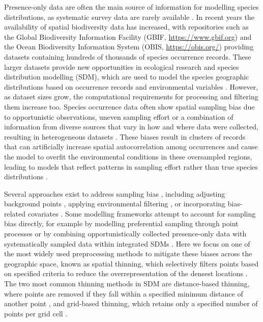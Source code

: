 Presence-only data are often the main source of information for modelling species distributions, as systematic survey data are rarely available \citep{pearce2006modelling}. In recent years the availability of spatial biodiversity data has increased, with repositories such as the Global Biodiversity Information Facility (GBIF, \url{https://www.gbif.org}) and the Ocean Biodiversity Information System (OBIS, \url{https://obis.org/}) providing datasets containing hundreds of thousands of species occurrence records. These larger datasets provide new opportunities in ecological research and species distribution modelling (SDM), which are used to model the species geographic distributions based on occurrence records and environmental variables \citep{pulliam2000relationship, elith2009species, miller2010species, guisan2013predicting}. However, as dataset sizes grow, the computational requirements for processing and filtering them increase too. Species occurrence data often show spatial sampling bias due to opportunistic observations, uneven sampling effort or a combination of information from diverse sources that vary in how and where data were collected, resulting in heterogeneous datasets \citep{boakes2010distorted, lobo2011exploring, beck2014spatial, meyer2016range, hughes2021sampling}. These biases result in clusters of records that can artificially increase spatial autocorrelation among occurrences and cause the model to overfit the environmental conditions in these oversampled regions, leading to models that reflect patterns in sampling effort rather than true species distributions \citep{wisz2008effects, phillips2009sample, higa2015mapping, cosentino2021geographic, steen2021spatial}.

Several approaches exist to address sampling bias \citep{inman2021comparing, baker2024effective, moudry2024optimising}, including adjusting background points \citep{barber2022target, vollering2019bunching}, applying environmental filtering \citep{castellanos2019environmental}, or incorporating bias-related covariates \citep{varela2014environmental, chauvier2021novel}. Some modelling frameworks attempt to account for sampling bias directly, for example by modelling preferential sampling through point processes \citep{diggle2010geostatistical, pennino2019accounting, amaral2024model} or by combining opportunistically collected presence-only data with systematically sampled data within integrated SDMs \citep{koshkina2017integrated, simmonds2020more, makinen2024integrated}. Here we focus on one of the most widely used preprocessing methods to mitigate these biases across the geographic space, known as spatial thinning, which selectively filters points based on specified criteria to reduce the overrepresentation of the densest locations \citep{veloz2009spatially, boria2014spatial}. The two most common thinning methods in SDM are distance-based thinning, where points are removed if they fall within a specified minimum distance of another point \citep{aiello2015spthin}, and grid-based thinning, which retains only a specified number of points per grid cell \citep{dismoRpackage}.

